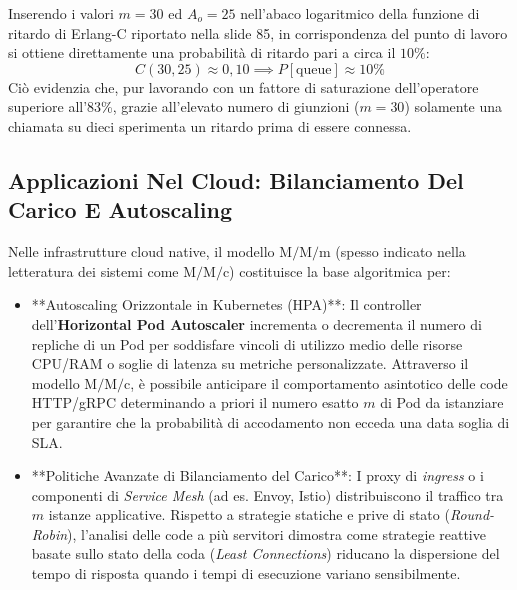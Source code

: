\documentclass[11pt, a4paper]{article}
\begin{document}

Inserendo i valori $m=30$ ed $A_o=25$ nell'abaco logaritmico della funzione di ritardo di Erlang-C riportato nella slide 85, in corrispondenza del punto di lavoro si ottiene direttamente una probabilità di ritardo pari a circa il $10\%$:
\[
C(30, 25) \approx 0{,}10 \implies P[\text{queue}] \approx 10\%
\]
Ciò evidenzia che, pur lavorando con un fattore di saturazione dell'operatore superiore all'83\%, grazie all'elevato numero di giunzioni ($m=30$) solamente una chiamata su dieci sperimenta un ritardo prima di essere connessa.

\subsection{Applicazioni Nel Cloud: Bilanciamento Del Carico E Autoscaling}

Nelle infrastrutture cloud native, il modello $\mathrm{M/M/m}$ (spesso indicato nella letteratura dei sistemi come $\mathrm{M/M/c}$) costituisce la base algoritmica per:
\begin{itemize}
    \item **Autoscaling Orizzontale in Kubernetes (HPA)**: Il controller dell'\textbf{Horizontal Pod Autoscaler} incrementa o decrementa il numero di repliche di un Pod per soddisfare vincoli di utilizzo medio delle risorse CPU/RAM o soglie di latenza su metriche personalizzate. Attraverso il modello $\mathrm{M/M/c}$, è possibile anticipare il comportamento asintotico delle code HTTP/gRPC determinando a priori il numero esatto $m$ di Pod da istanziare per garantire che la probabilità di accodamento non ecceda una data soglia di SLA.
    \item **Politiche Avanzate di Bilanciamento del Carico**: I proxy di \emph{ingress} o i componenti di \emph{Service Mesh} (ad es. Envoy, Istio) distribuiscono il traffico tra $m$ istanze applicative. Rispetto a strategie statiche e prive di stato (\emph{Round-Robin}), l'analisi delle code a più servitori dimostra come strategie reattive basate sullo stato della coda (\emph{Least Connections}) riducano la dispersione del tempo di risposta quando i tempi di esecuzione variano sensibilmente.
\end{itemize}

\newpage
\end{document}

